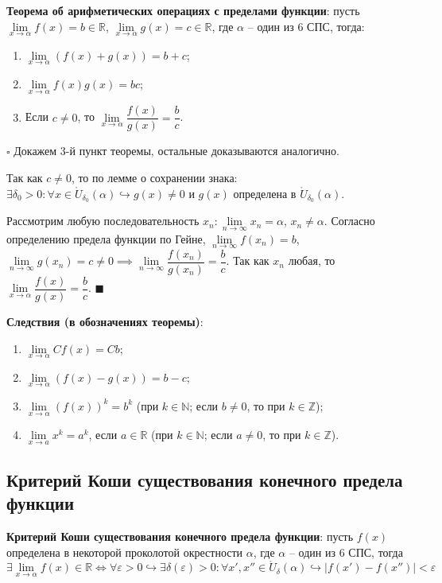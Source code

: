 \documentclass[12pt, a4paper, reqno]{article}
\begin{document}
    \textbf{Теорема об арифметических операциях с пределами функции}: пусть $\lim\limits_{x\to\alpha}
    f(x) = b\in\mathbb{R}$, $\lim\limits_{x\to\alpha} g(x) = c\in\mathbb{R}$, где $\alpha$ -- один
    из 6 СПС, тогда:
    \begin{enumerate}
        \item $\lim\limits_{x\to\alpha} (f(x) + g(x)) = b + c$;
        \item $\lim\limits_{x\to\alpha} f(x)g(x) = bc$;
        \item Если $c\neq 0$, то $\lim\limits_{x\to\alpha} \dfrac{f(x)}{g(x)} = \dfrac{b}{c}$.
    \end{enumerate}

    $\square$ Докажем 3-й пункт теоремы, остальные доказываются аналогично.

    Так как $c\neq 0$, то по лемме о сохранении знака: $\exists\delta_0 > 0: \forall x\in\mathring
    U_{\delta_0}(\alpha)\hookrightarrow g(x)\neq 0$ и $g(x)$ определена в $\mathring
    U_{\delta_0}(\alpha)$.

    Рассмотрим любую последовательность $x_n: \lim\limits_{n\to\infty} x_n = \alpha$, $x_n \neq
    \alpha$. Согласно определению предела функции по Гейне, $\lim\limits_{n\to\infty} f(x_n) = b$,
    $\lim\limits_{n\to\infty} g(x_n) = c\neq 0 \implies \lim\limits_{n\to\infty}
    \dfrac{f(x_n)}{g(x_n)} = \dfrac{b}{c}$. Так как $x_n$ любая, то $\lim\limits_{x\to\alpha}
    \dfrac{f(x)}{g(x)} = \dfrac{b}{c}$. $\blacksquare$

    \textbf{Следствия (в обозначениях теоремы)}:
    \begin{enumerate}
        \item $\lim\limits_{x\to\alpha} Cf(x) = Cb$;
        \item $\lim\limits_{x\to\alpha} (f(x) - g(x)) = b - c$;
        \item $\lim\limits_{x\to\alpha} (f(x))^k = b^k$ (при $k\in\mathbb{N}$; если $b \neq 0$, то
              при $k\in\mathbb{Z}$);
        \item $\lim\limits_{x\to a} x^k = a^k$, если $a\in\mathbb{R}$ (при $k\in\mathbb{N}$; если
              $a \neq 0$, то при $k\in\mathbb{Z}$).
    \end{enumerate}

\subsection{Критерий Коши существования конечного предела функции}

    \textbf{Критерий Коши существования конечного предела функции}: пусть $f(x)$ определена в
    некоторой проколотой окрестности $\alpha$, где $\alpha$ -- один из 6 СПС, тогда
    \begin{equation*}
        \exists\lim\limits_{x\to\alpha} f(x) \in\mathbb{R} \iff \forall\varepsilon > 0
        \hookrightarrow\exists\delta(\varepsilon) > 0: \forall x', x'' \in \mathring
        U_{\delta}(\alpha) \hookrightarrow |f(x') - f(x'')| < \varepsilon
    \end{equation*}
\end{document}
